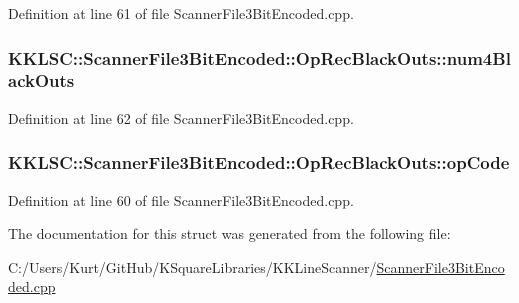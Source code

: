 Definition at line 61 of file Scanner\+File3\+Bit\+Encoded.\+cpp.

\subsubsection[{\texorpdfstring{num4\+Black\+Outs}{num4BlackOuts}}]{ K\+K\+L\+S\+C\+::\+Scanner\+File3\+Bit\+Encoded\+::\+Op\+Rec\+Black\+Outs\+::num4\+Black\+Outs}\hypertarget{struct_scanner_file3_bit_encoded_1_1_op_rec_black_outs_af8ee06cfb18cead735b49c186c851769}{}\label{struct_scanner_file3_bit_encoded_1_1_op_rec_black_outs_af8ee06cfb18cead735b49c186c851769}


Definition at line 62 of file Scanner\+File3\+Bit\+Encoded.\+cpp.

\subsubsection[{\texorpdfstring{op\+Code}{opCode}}]{ K\+K\+L\+S\+C\+::\+Scanner\+File3\+Bit\+Encoded\+::\+Op\+Rec\+Black\+Outs\+::op\+Code}\hypertarget{struct_scanner_file3_bit_encoded_1_1_op_rec_black_outs_a462f9e9087a063f337aea3916b9f735b}{}\label{struct_scanner_file3_bit_encoded_1_1_op_rec_black_outs_a462f9e9087a063f337aea3916b9f735b}


Definition at line 60 of file Scanner\+File3\+Bit\+Encoded.\+cpp.



The documentation for this struct was generated from the following file\+:\begin{DoxyCompactItemize}
\item 
C\+:/\+Users/\+Kurt/\+Git\+Hub/\+K\+Square\+Libraries/\+K\+K\+Line\+Scanner/\hyperlink{_scanner_file3_bit_encoded_8cpp}{Scanner\+File3\+Bit\+Encoded.\+cpp}\end{DoxyCompactItemize}
